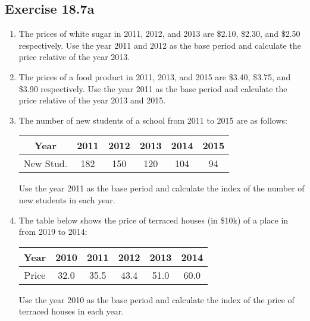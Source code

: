 \documentclass{report}
\begin{document}
\begin{multicols}{2}
  \subsection*{Exercise 18.7a}

  \begin{enumerate}
    \item The prices of white sugar in 2011, 2012, and 2013 are \$2.10, \$2.30, and
          \$2.50 respectively. Use the year 2011 and 2012 as the base period and
          calculate the price relative of the year 2013.

    \item The prices of a food product in 2011, 2013, and 2015 are \$3.40, \$3.75, and
          \$3.90 respectively. Use the year 2011 as the base period and calculate the
          price relative of the year 2013 and 2015.

    \item The number of new students of a school from 2011 to 2015 are as follows:
          \begin{center}
            \begin{tabular}{|c|c|c|c|c|c|}
              \hline
              Year      & 2011 & 2012 & 2013 & 2014 & 2015 \\
              \hline
              New Stud. & 182  & 150  & 120  & 104  & 94   \\
              \hline
            \end{tabular}
          \end{center}
          Use the year 2011 as the base period and calculate the index of the number of new students in each year.

    \item The table below shows the price of terraced houses (in \$10k) of a place in
          from 2019 to 2014:
          \begin{center}
            \begin{tabular}{|c|c|c|c|c|c|}
              \hline
              Year  & 2010 & 2011 & 2012 & 2013 & 2014 \\
              \hline
              Price & 32.0 & 35.5 & 43.4 & 51.0 & 60.0 \\
              \hline
            \end{tabular}
          \end{center}
          Use the year 2010 as the base period and calculate the index of the price of terraced houses in each year.


\end{enumerate}
\end{multicols}
\end{document}
